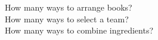 \documentclass[preview]{standalone}
\begin{document}
How many ways to arrange books?\\How many ways to select a team?\\How many ways to combine ingredients?\\
\end{document}
